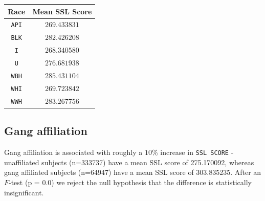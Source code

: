 \begin{table}[h!]
\centering
\begin{tabular}{||c c||} 
 \hline
 Race & Mean SSL Score \\ [0.5ex] 
 \hline\hline
\texttt{API}	& $269.433831$\\
\texttt{BLK}	& $282.426208$\\
\texttt{I}	& $268.340580$\\
\texttt{U}	& $276.681938$\\
\texttt{WBH}	& $285.431104$\\
\texttt{WHI} & $269.723842$\\
\texttt{WWH}	& $283.267756$\\ 
 \hline
\end{tabular}
\label{table:1}
\end{table}
\subsection{Gang affiliation}
Gang affiliation is associated with roughly a $10$\% increase in \texttt{SSL SCORE} - unaffiliated subjects (n=333737) have a mean SSL score of 275.170092, whereas gang affiliated subjects (n=64947) have a mean SSL score of 303.835235. After an $F$-test (p = 0.0) we reject the null hypothesis that the difference is statistically insignificant.
